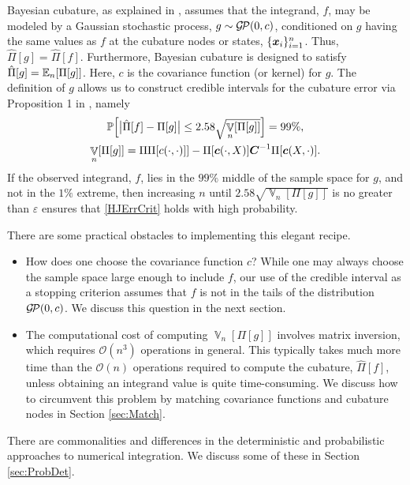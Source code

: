 \documentclass[sts]{imsart}
\numberwithin{equation}{section}
\theoremstyle{plain}
\newcommand{\vC}{\boldsymbol{C}}
\newcommand{\calGP}{\cg\!\cp}
\DeclareMathOperator{\Var}{\mathbb{V}}
\newcommand{\BOGOS}{\citetalias{BriEtal18a}}%
\begin{document}
Bayesian cubature, as explained in \BOGOS{}, assumes that the integrand, $f$, may be modeled by a Gaussian stochastic process, $g \sim \calGP(0,c)$, conditioned on $g$ having the same values as $f$ at the cubature nodes or states, $\{\boldsymbol{x}_i\}_{i=1}^n$.  Thus, $\hat{\Pi}[g] = \hat{\Pi}[f]$.  Furthermore, Bayesian cubature is designed to satisfy $\hat{\Pi}[g] = \operatorname{\mathbb{E}}_n[\Pi[g]]$.  Here, $c$ is the covariance function (or kernel) for $g$.  The definition of $g$ allows us to construct credible intervals for the cubature error via Proposition 1 in  \BOGOS{}, namely
\begin{gather}
\label{credInt}
    \Prob\Bigl[\bigl \lvert \hat{\Pi}[f] - \Pi[g] \bigr \rvert \le 2.58 \sqrt{\Var_n[\Pi[g]]}  \Bigr] = 99\%, \\
    \label{Vnform}
    \Var_n[\Pi[g]] = \Pi\Pi[c(\cdot,\cdot)]] - \Pi[\vc(\cdot,X)] \vC^{-1} \Pi[\vc(X,\cdot)].
\end{gather}
If the observed integrand, $f$, lies in the $99\%$ middle of the sample space for $g$, and not in the $1\%$ extreme, then increasing $n$ until $2.58 \sqrt{\Var_n[\Pi[g]]}$ is no greater than $\varepsilon$ ensures that  \eqref{HJErrCrit} holds with high probability.

There are some practical obstacles to implementing this elegant recipe. 

\begin{itemize} 

\item How does one choose the covariance function $c$?  While one may always choose the sample space large enough to include $f$, our use of the credible interval as a stopping criterion assumes that $f$ is not in the tails of the distribution $\calGP(0,c)$.  We discuss this question in the next section.  

\item The computational cost of computing $\Var_n[\Pi[g]]$ involves matrix inversion, which requires $\mathcal{O}(n^3)$ operations in general.  This typically takes much more time than the $\mathcal{O}(n)$ operations required to compute the cubature, $\hat{\Pi}[f]$, unless obtaining an integrand value is quite time-consuming. We discuss how to circumvent this problem by matching covariance functions and cubature nodes in Section \ref{sec:Match}.

\end{itemize}
There are commonalities and differences in the deterministic and probabilistic approaches to numerical integration.  We discuss some of these in Section \ref{sec:ProbDet}.
\end{document}
